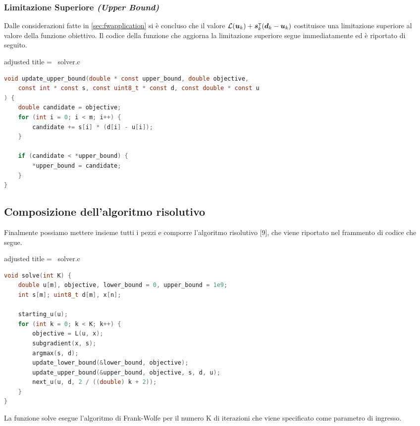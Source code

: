 \subsubsection{Limitazione Superiore \textit{(Upper Bound)}}
Dalle considerazioni fatte in \ref{sec:fwapplication} si è concluso che il valore
\(
\mathcal{L}(\bm{u}_k) + \bm{s}_k^{\scriptscriptstyle\mathrm{T}}(\bm{d}_k - \bm{u}_k)
\)
costituisce una limitazione superiore al valore della funzione obiettivo. Il codice della funzione che aggiorna la
limitazione superiore segue immediatamente ed è riportato di seguito.

\begin{code}{adjusted title = {\cicon\ solver.c}}
\begin{lstlisting}[language=c, style = style, caption={Aggiornamento della limitazione superiore.}]
void update_upper_bound(double * const upper_bound, double objective,
    const int * const s, const uint8_t * const d, const double * const u
) {
    double candidate = objective;
    for (int i = 0; i < m; i++) {
        candidate += s[i] * (d[i] - u[i]);
    }

    if (candidate < *upper_bound) {
        *upper_bound = candidate;
    }
}
\end{lstlisting}
\end{code}

\subsection{Composizione dell'algoritmo risolutivo}
Finalmente possiamo mettere insieme tutti i pezzi e comporre l'algoritmo risolutivo [9], che viene riportato nel frammento
di codice che segue.

\begin{code}{adjusted title = {\cicon\ solver.c}}
\begin{lstlisting}[language=c, style = style, caption={Implementazione dell'algoritmo risolutivo.}]
void solve(int K) {
    double u[m], objective, lower_bound = 0, upper_bound = 1e9;
    int s[m]; uint8_t d[m], x[n];

    starting_u(u);
    for (int k = 0; k < K; k++) {
        objective = L(u, x);
        subgradient(x, s);
        argmax(s, d);
        update_lower_bound(&lower_bound, objective);
        update_upper_bound(&upper_bound, objective, s, d, u);
        next_u(u, d, 2 / ((double) k + 2));
    }
}
\end{lstlisting}
\end{code}

\noindent
La funzione {\jbm solve} esegue l'algoritmo di Frank-Wolfe per il numero {\jbm K} di iterazioni che viene specificato
come parametro di ingresso.


